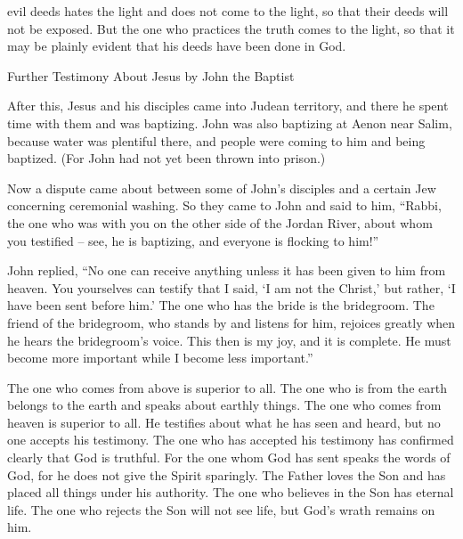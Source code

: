 {evil deeds
hates
the light
and
does
not
come
to
the light,
so that
their
deeds
will
not
be exposed.
But
the one who practices
the truth
comes
to
the light,
so that
it may be plainly evident
that his
deeds
have been done
in
God.
\par }{\SH Further Testimony About Jesus by John the Baptist
\par }{\PP {}After
this,
Jesus
and
his
disciples
came
into
Judean
territory,
and
there
he spent time
with
them
and
was baptizing.
John
was
also
baptizing
at
Aenon
near
Salim,
because
water
was
plentiful
there,
and
people were coming
to him and
being baptized.
(For
John
had
not yet
been thrown
into
prison.)
\par }{\PP {}Now
a dispute
came about between
some of John’s
disciples
and
a certain Jew
concerning
ceremonial washing.
So
they came
to
John
and
said
to him,
“Rabbi,
the one who
was
with
you
on the other side
of the Jordan River,
about whom
you
testified
– see,
he
is baptizing,
and
everyone
is flocking
to
him!”
\par }{\PP {}John
replied, “No
one
can
receive
anything
unless
it
has been given
to him
from
heaven.
You
yourselves
can testify
that
I
said,
‘I
am
not
the Christ,’
but rather,
‘I
have been sent
before
him.’
The one who has
the bride
is
the bridegroom.
The friend
of the
bridegroom,
who stands by
and
listens
for him,
rejoices
greatly
when he hears
the bridegroom’s
voice.
This
then
is my
joy,
and it is complete.
He
must
become more important
while I
become less important.”
\par }{\PP {}The one who comes
from above
is
superior
to all.
The one who is
from
the earth
belongs
to the earth
and
speaks
about
earthly things.
The one who comes
from
heaven
is
superior
to all.
He testifies
about what
he has seen
and
heard,
but
no one
accepts
his
testimony.
The one who has accepted
his
testimony
has confirmed clearly
that
God
is
truthful.
For
the one whom
God
has sent
speaks
the words
of God,
for
he does
not
give
the Spirit
sparingly.
The Father
loves
the Son
and
has placed
all things
under
his
authority.
The one who believes
in
the Son
has
eternal
life.
The one who rejects
the Son
will
not
see
life,
but
God’s
wrath
remains
on
him.

}
